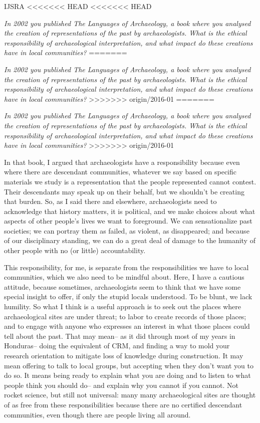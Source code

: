 \begin{labeling}{IJSRA}
<<<<<<< HEAD
<<<<<<< HEAD
\item[IJSRA] \emph{In 2002 you published \emph{The Languages of Archaeology}, a book where you analysed the creation of representations of the past by archaeologists. What is the ethical responsibility of archaeological interpretation, and what impact do these creations have in local communities?} 
=======
\item[IJSRA] \textit{In 2002 you published \emph{The Languages of Archaeology}, a book where you analysed the creation of representations of the past by archaeologists. What is the ethical responsibility of archaeological interpretation, and what impact do these creations have in local communities?} 
>>>>>>> origin/2016-01
=======
\item[IJSRA] \textit{In 2002 you published \emph{The Languages of Archaeology}, a book where you analysed the creation of representations of the past by archaeologists. What is the ethical responsibility of archaeological interpretation, and what impact do these creations have in local communities?} 
>>>>>>> origin/2016-01

\item[RAJ] In that book, I argued that archaeologists have a responsibility because even where there are descendant communities, whatever we say based on specific materials we study is a representation that the people represented cannot contest. Their descendants may speak up on their behalf, but we shouldn't be creating that burden. So, as I said there and elsewhere, archaeologists need to acknowledge that history matters, it is political, and we make choices about what aspects of other people's lives we want to foreground. We can sensationalize past societies; we can portray them as failed, as violent, as disappeared; and because of our disciplinary standing, we can do a great deal of damage to the humanity of other people with no (or little) accountability.

This responsibility, for me, is separate from the responsibilities we have to local communities, which we also need to be mindful about. Here, I have a cautious attitude, because sometimes, archaeologists seem to think that we have some special insight to offer, if only the stupid locals understood. To be blunt, we lack humility. So what I think is a useful approach is to seek out the places where archaeological sites are under threat; to labor to create records of those places; and to engage with anyone who expresses an interest in what those places could tell about the past. That may mean-- as it did through most of my years in Honduras-- doing the equivalent of CRM, and finding a way to mold your research orientation to mitigate loss of knowledge during construction. It may mean offering to talk to local groups, but accepting when they don't want you to do so. It means being ready to explain what you are doing and to listen to what people think you should do-- and explain why you cannot if you cannot. Not rocket science, but still not universal: many many archaeological sites are thought of as free from these responsibilities because there are no certified descendant communities, even though there are people living all around.


\end{labeling}
